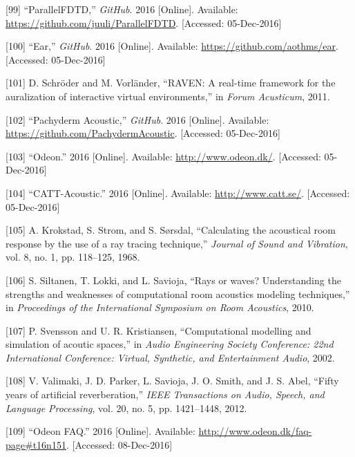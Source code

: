 \documentclass[]{scrreprt}
\begin{document}
\hypertarget{ref-ux5fparallelfdtdux5f2016}{}
{[}99{]} ``ParallelFDTD,'' \emph{GitHub}. 2016 {[}Online{]}. Available:
\url{https://github.com/juuli/ParallelFDTD}. {[}Accessed: 05-Dec-2016{]}

\hypertarget{ref-ux5fearux5f2016}{}
{[}100{]} ``Ear,'' \emph{GitHub}. 2016 {[}Online{]}. Available:
\url{https://github.com/aothms/ear}. {[}Accessed: 05-Dec-2016{]}

\hypertarget{ref-schroderux5fraven:ux5f2011}{}
{[}101{]} D. Schröder and M. Vorländer, ``RAVEN: A real-time framework
for the auralization of interactive virtual environments,'' in
\emph{Forum Acusticum}, 2011.

\hypertarget{ref-ux5fpachydermux5f2016}{}
{[}102{]} ``Pachyderm Acoustic,'' \emph{GitHub}. 2016 {[}Online{]}.
Available: \url{https://github.com/PachydermAcoustic}. {[}Accessed:
05-Dec-2016{]}

\hypertarget{ref-ux5fodeonux5f2016}{}
{[}103{]} ``Odeon.'' 2016 {[}Online{]}. Available:
\url{http://www.odeon.dk/}. {[}Accessed: 05-Dec-2016{]}

\hypertarget{ref-ux5fcatt-acousticux5f2016}{}
{[}104{]} ``CATT-Acoustic.'' 2016 {[}Online{]}. Available:
\url{http://www.catt.se/}. {[}Accessed: 05-Dec-2016{]}

\hypertarget{ref-krokstadux5fcalculatingux5f1968}{}
{[}105{]} A. Krokstad, S. Strom, and S. Sørsdal, ``Calculating the
acoustical room response by the use of a ray tracing technique,''
\emph{Journal of Sound and Vibration}, vol. 8, no. 1, pp. 118--125,
1968.

\hypertarget{ref-siltanenux5fraysux5f2010}{}
{[}106{]} S. Siltanen, T. Lokki, and L. Savioja, ``Rays or waves?
Understanding the strengths and weaknesses of computational room
acoustics modeling techniques,'' in \emph{Proceedings of the
International Symposium on Room Acoustics}, 2010.

\hypertarget{ref-svenssonux5fcomputationalux5f2002}{}
{[}107{]} P. Svensson and U. R. Kristiansen, ``Computational modelling
and simulation of acoutic spaces,'' in \emph{Audio Engineering Society
Conference: 22nd International Conference: Virtual, Synthetic, and
Entertainment Audio}, 2002.

\hypertarget{ref-valimakiux5ffiftyux5f2012}{}
{[}108{]} V. Valimaki, J. D. Parker, L. Savioja, J. O. Smith, and J. S.
Abel, ``Fifty years of artificial reverberation,'' \emph{IEEE
Transactions on Audio, Speech, and Language Processing}, vol. 20, no. 5,
pp. 1421--1448, 2012.

\hypertarget{ref-ux5fodeonux5f2016-1}{}
{[}109{]} ``Odeon FAQ.'' 2016 {[}Online{]}. Available:
\url{http://www.odeon.dk/faq-page\#t16n151}. {[}Accessed: 08-Dec-2016{]}
\end{document}
